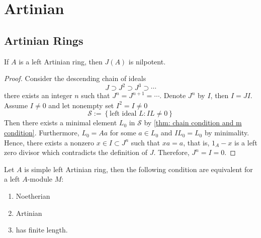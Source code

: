 \chapter{Artinian}

\section{Artinian Rings}

\begin{lemma}
    If $A$ is a left Artinian ring, then $J(A)$ is nilpotent.
    \begin{proof}
        Consider the descending chain of ideals
        \begin{equation*}
            J \supset J^2 \supset J^3 \supset \cdots
        \end{equation*}
        there exists an integer $n$ such that $J^n=J^{n+1}=\cdots$.
        Denote $J^n$ by $I$, then $I=J  I$.
        Assume $I \neq 0$ and let nonempty set $I^2=I\neq 0$
        \begin{equation*}
            \mathcal{S}
            :=
            \left\{\text{left ideal } L:IL\neq 0\right\}
        \end{equation*}
        Then there exists a minimal element $L_0$ in $\mathcal{S}$ by \ref{thm: chain condition and m condition}.
        Furthermore, $L_0=Aa$ for some $a \in L_0$ and $IL_0=L_0$ by minimality.
        Hence, there exists a nonzero $x \in I\subset J^n$ such that $x a=a$, that is, $1_A - x$ is a left zero divisor which contradicts the definition of $J$.
        Therefore, $J^n=I=0$.
    \end{proof}
\end{lemma}

\begin{lemma}
    Let $A$ is simple left Artinian ring, then the following condition are equivalent for a left $A$-module $M$:
    \begin{enumerate}
        \item Noetherian
        \item Artinian
        \item has finite length.
    \end{enumerate}
\end{lemma}




